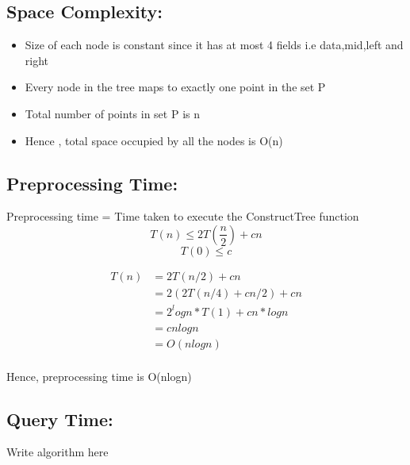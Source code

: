 \documentclass[11pt]{article}
\begin{document}
\subsection*{Space Complexity:}  
\begin{itemize}
\item Size of each node is constant since it has at most 4 fields i.e data,mid,left and right
\item Every node in the tree maps to exactly one point in the set P
\item Total number of points in set P is n
\item Hence , total space occupied by all the nodes is O(n)
\end{itemize}

\subsection*{Preprocessing Time:}

Preprocessing time = Time taken to execute the ConstructTree function
\[T(n) \leq 2T(\frac{n}{2}) + cn \]
\[T(0) \leq c\]

\begin{align*}
T(n) & = 2T(n/2) + cn \\
&= 2(2T(n/4) + cn/2) + cn \\
&= 2^logn * T(1) + cn * logn \\
&= cnlogn   \\
&= O(nlogn) \\
\end{align*}


Hence, preprocessing time is O(nlogn)

\subsection*{Query Time:}

\begin{algorithm}
Write algorithm here
\end{algorithm}
\end{document}
